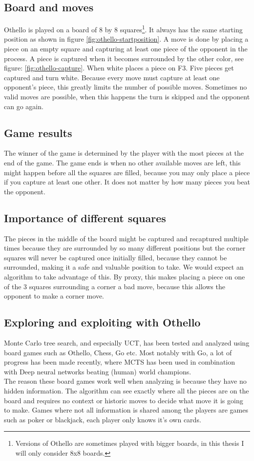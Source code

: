 \documentclass[
11pt, %
english, %
singlespacing, %
headsepline, %
]{MastersDoctoralThesis} %
\begin{document}
\subsection{Board and moves}
Othello is played on a board of 8 by 8 squares\footnote{Versions of Othello are sometimes played with bigger boards, in this thesis I will only consider 8x8 boards.}. It always has the same starting position as shown in figure \ref{fig:othello-startposition}. A move is done by placing a piece on an empty square and capturing at least one piece of the opponent in the process. A piece is captured when it becomes surrounded by the other color, see figure: \ref{fig:othello-capture}. When white places a piece on F3. Five pieces get captured and turn white. Because every move must capture at least one opponent's piece, this greatly limits the number of possible moves. Sometimes no valid moves are possible, when this happens the turn is skipped and the opponent can go again.
\subsection{Game results} The winner of the game is determined by the player with the most pieces at the end of the game. The game ends is when no other available moves are left, this might happen before all the squares are filled, because you may only place a piece if you capture at least one other. It does not matter by how many pieces you beat the opponent.
\subsection{Importance of different squares} The pieces in the middle of the board might be captured and recaptured multiple times because they are surrounded by so many different positions but the corner squares will never be captured once initially filled, because they cannot be surrounded, making it a safe and valuable position to take. We would expect an algorithm to take advantage of this. By proxy, this makes placing a piece on one of the 3 squares surrounding a corner a bad move, because this allows the opponent to make a corner move.

\subsection{Exploring and exploiting with Othello}
Monte Carlo tree search, and especially UCT, has been tested and analyzed using board games such as Othello, Chess, Go etc. Most notably with Go, a lot of progress has been made recently, where MCTS has been used in combination with Deep neural networks beating (human) world champions\cite{deepmind}.\\
The reason these board games work well when analyzing is because they have no hidden information. The algorithm can see exactly where all the pieces are on the board and requires no context or historic moves to decide what move it is going to make. Games where not all information is shared among the players are games such as poker or blackjack, each player only knows it's own cards.\\
\end{document}
